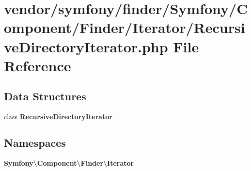 \section{vendor/symfony/finder/\+Symfony/\+Component/\+Finder/\+Iterator/\+Recursive\+Directory\+Iterator.php File Reference}
\label{_recursive_directory_iterator_8php}
\subsection*{Data Structures}
\begin{DoxyCompactItemize}
\item 
class {\bf Recursive\+Directory\+Iterator}
\end{DoxyCompactItemize}
\subsection*{Namespaces}
\begin{DoxyCompactItemize}
\item 
 {\bf Symfony\textbackslash{}\+Component\textbackslash{}\+Finder\textbackslash{}\+Iterator}
\end{DoxyCompactItemize}

